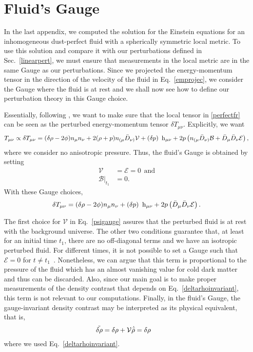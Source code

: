 \documentclass[a4paper,11pt]{article}
\begin{document}
\section{Fluid's Gauge}
\label{appgauge}
In the last appendix, we computed the solution for the Einstein equations for an inhomogeneous dust-perfect fluid with a spherically symmetric local metric. To use this solution and compare it with our perturbations defined in Sec.~\ref{linearpert}, we must ensure that measurements in the local metric are in the same Gauge as our perturbations. Since we projected the energy-momentum tensor in the direction of the velocity of the fluid in Eq.~\eqref{emprojec}, we consider the Gauge where the fluid is at rest and we shall now see how to define our perturbation theory in this Gauge choice.

Essentially, following \cite{Vitenti2014covariant}, we want to make sure that the local tensor in \eqref{perfectfr} can be seen as the perturbed energy-momentum tensor $\delta T_{\mu\nu}$. Explicitly, we want
\begin{align}
	T_{\mu \nu}\propto \delta T_{\mu \nu}=(\delta \rho-2 \phi) n_\mu n_\nu+2(\rho+p) n_{(\mu} \Bar{D}_{\nu)}\mathcal{V}+ \left(\delta p \right)\mathrm{~h}_{\mu \nu}+2 p\left(n_{(\mu} \Bar{D}_{\nu)}\mathcal{B}+\Bar{D}_\mu \Bar{D}_\nu \mathcal{E}\right)
	,\end{align}
where we consider no anisotropic pressure. Thus,
the fluid's Gauge is obtained by setting
\begin{align}
	\label{psigauge}
	\mathcal{V}             & = \mathcal{E}= 0 ~~\text{and} \\
	\mathcal{B}\rvert_{t_1} & = 0
	.\end{align}
With these Gauge choices,
\begin{align}
	\label{tensorconect}
	\delta T_{\mu \nu}=(\delta \rho-2 \phi) n_\mu n_\nu+ \left(\delta p \right)\mathrm{~h}_{\mu \nu}+2 p\left(\Bar{D}_\mu \Bar{D}_\nu \mathcal{E}\right)
	.\end{align}

The first choice for $\mathcal{V}$ in Eq.~\eqref{psigauge} assures that the perturbed fluid is at rest with the background universe. The other two conditions guarantee that, at least for an initial time $t_1$, there are no off-diagonal terms and we have an isotropic perturbed fluid. For different times, it is not possible to set a Gauge such that $\mathcal{E}=0$ for $t \neq t_1$~\cite{vitenti2012large}. Nonetheless, we can argue that this term is proportional to the pressure of the fluid which has an almost vanishing value for cold dark matter and thus can be discarded. Also, since our main goal is to make proper measurements of the density contrast that depends on Eq.~\eqref{deltarhoinvariant}, this term is not relevant to our computations. Finally, in the fluid's Gauge, the gauge-invariant density contrast may be interpreted as its physical equivalent, that is,
\begin{align}
	\label{physicalrho}
	\Tilde{\delta \rho} & = \delta \rho + \mathcal{V}\dot{\Bar{\rho}} = \delta \rho\end{align}
where we used Eq.~\eqref{deltarhoinvariant}.
\acknowledgments
\end{document}
